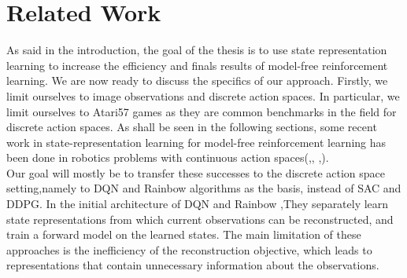 \chapter{Related Work}


As said in the introduction, the goal of the thesis is to use
state representation learning to increase the efficiency 
and finals results of model-free reinforcement learning.
We are now ready to discuss the specifics of our approach.
Firstly, we limit ourselves to image observations and discrete action spaces.
In particular, we limit ourselves to Atari57 games as they are common benchmarks in the field 
for discrete action spaces.
As shall be seen in the following sections, 
some recent work in state-representation learning for  
model-free reinforcement learning has been done in robotics 
problems with continuous action spaces(\cite{yarats},\cite{}, \cite{},).\\

Our goal will mostly be to transfer these successes to the discrete action space setting,namely to DQN and Rainbow algorithms as the basis, instead of SAC and DDPG. In the initial architecture of DQN and Rainbow ,They separately learn state representations from which current observations can be reconstructed, and train a forward model on the learned states. The main limitation of these approaches is the inefficiency of the reconstruction objective, which leads to representations that contain unnecessary information about the observations.

